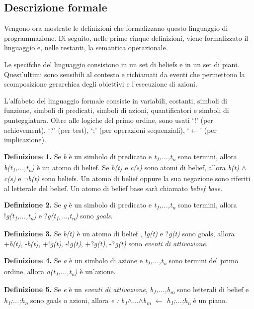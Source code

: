 \subsection{Descrizione formale}
Vengono ora mostrate le definizioni che formalizzano questo linguaggio di programmazione.
Di seguito, nelle prime cinque definizioni, viene formalizzato il linguaggio e, nelle restanti, la semantica operazionale.

\medskip
Le specifche del linguaggio consistono in un set di beliefs e in un set di piani. Quest'ultimi sono sensibili al contesto e richiamati da eventi che permettono la scomposizione gerarchica degli obiettivi e l'esecuzione di azioni.

L'alfabeto del linguaggio formale consiste in variabili, costanti, simboli di funzione, simboli di predicati, simboli di azioni, quantificatori e simboli di punteggiatura. Oltre alle logiche del primo ordine, sono usati `!' (per achievement), `?' (per test), `;' (per operazioni sequenziali), `$\leftarrow$' (per implicazione).

\smallskip
\textbf{Definizione 1.} Se \textit{b} \`e un simbolo di predicato e \textit{t\textsubscript{1},...,t\textsubscript{n}} sono termini, allora \textit{b(t\textsubscript{1},...,t\textsubscript{n})} \`e un atomo di belief. Se \textit{b(t)} e \textit{c(s)} sono atomi di belief, allora \textit{b(t) $\land$ c(s)} e \textit{$\neg$b(t)} sono beliefs. Un atomo di belief oppure la sua negazione sono riferiti al letterale del belief. Un atomo di belief base sar\`a chiamato \textit{belief base}.

\smallskip
\textbf{Definizione 2.} Se \textit{g} \`e un simbolo di predicato e \textit{t\textsubscript{1},...,t\textsubscript{n}} sono termini, allora !\textit{g(t\textsubscript{1},...,t\textsubscript{n})} e ?\textit{g(t\textsubscript{1},...,t\textsubscript{n})} sono \textit{goals}.

\smallskip
\textbf{Definizione 3.} Se \textit{b(t)} \`e un atomo di belief , !\textit{g(t)} e ?\textit{g(t)} sono goals, allora +\textit{b(t)}, -\textit{b(t)}, +!\textit{g(t)}, -!\textit{g(t)}, +?\textit{g(t)}, -?\textit{g(t)} sono \textit{eventi di attivazione}.

\smallskip
\textbf{Definizione 4.} Se \textit{a} \`e un simbolo di azione e \textit{t\textsubscript{1},...,t\textsubscript{n}} sono termini del primo ordine, allora \textit{a(t\textsubscript{1},...,t\textsubscript{n})} \`e un'azione.

\smallskip
\textbf{Definizione 5.} Se \textit{e} \`e un \textit{eventi di attivazione}, \textit{b\textsubscript{1},...,b\textsubscript{m}} sono letterali di belief e \textit{h\textsubscript{1};...;h\textsubscript{n}} sono goals o azioni, allora \textit{e : b\textsubscript{1}$\land$...$\land$b\textsubscript{m} $\leftarrow$ h\textsubscript{1};...;h\textsubscript{n}} \`e un piano.

